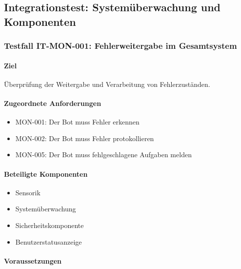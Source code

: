 \subsection{Integrationstest: Systemüberwachung und
Komponenten}\label{integrationstest-systemuxfcberwachung-und-komponenten}

\subsubsection{Testfall IT-MON-001: Fehlerweitergabe im
Gesamtsystem}\label{testfall-it-mon-001-fehlerweitergabe-im-gesamtsystem}

\paragraph{Ziel}\label{ziel-14}

Überprüfung der Weitergabe und Verarbeitung von Fehlerzuständen.

\paragraph{Zugeordnete
Anforderungen}\label{zugeordnete-anforderungen-14}

\begin{itemize}
\tightlist
\item
  MON-001: Der Bot muss Fehler erkennen
\item
  MON-002: Der Bot muss Fehler protokollieren
\item
  MON-005: Der Bot muss fehlgeschlagene Aufgaben melden
\end{itemize}

\paragraph{Beteiligte Komponenten}\label{beteiligte-komponenten-5}

\begin{itemize}
\tightlist
\item
  Sensorik
\item
  Systemüberwachung
\item
  Sicherheitskomponente
\item
  Benutzerstatusanzeige
\end{itemize}

\paragraph{Voraussetzungen}\label{voraussetzungen-14}

